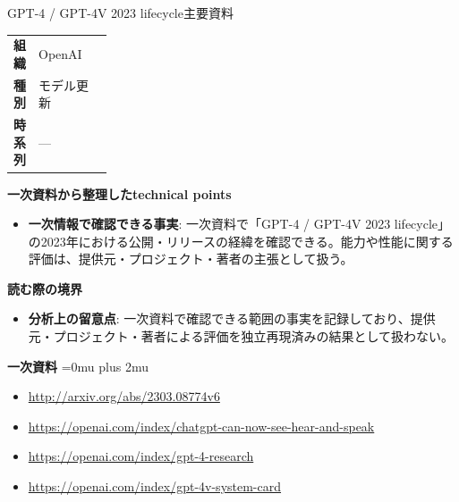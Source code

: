 \begin{technicalnote}{GPT-4 / GPT-4V 2023 lifecycle}{主要資料}
\begingroup
\begin{tabularx}{\linewidth}{@{}>{\bfseries}p{0.22\linewidth}X@{}}
組織 & OpenAI \\
種別 & モデル更新 \\
時系列 & — \\
\end{tabularx}
\smallskip
{\bfseries 一次資料から整理したtechnical points}
\begin{itemize}[leftmargin=1.5em,itemsep=0.35em]
\item \textbf{一次情報で確認できる事実}: 一次資料で「GPT-4 / GPT-4V 2023 lifecycle」の2023年における公開・リリースの経緯を確認できる。能力や性能に関する評価は、提供元・プロジェクト・著者の主張として扱う。
\end{itemize}
\begin{minipage}{\linewidth}
{\bfseries 読む際の境界}
\begin{itemize}[leftmargin=1.5em,itemsep=0.35em]
\item \textbf{分析上の留意点}: 一次資料で確認できる範囲の事実を記録しており、提供元・プロジェクト・著者による評価を独立再現済みの結果として扱わない。
\end{itemize}
\begin{samepage}
{\bfseries 一次資料}
\begingroup\sloppy
\Urlmuskip=0mu plus 2mu\relax
\begin{itemize}[leftmargin=1.5em,itemsep=0.25em]
\item {\scriptsize\url{http://arxiv.org/abs/2303.08774v6}}
\item {\scriptsize\url{https://openai.com/index/chatgpt-can-now-see-hear-and-speak}}
\item {\scriptsize\url{https://openai.com/index/gpt-4-research}}
\item {\scriptsize\url{https://openai.com/index/gpt-4v-system-card}}
\end{itemize}
\endgroup
\end{samepage}
\end{minipage}
\endgroup
\end{technicalnote}
\medskip

